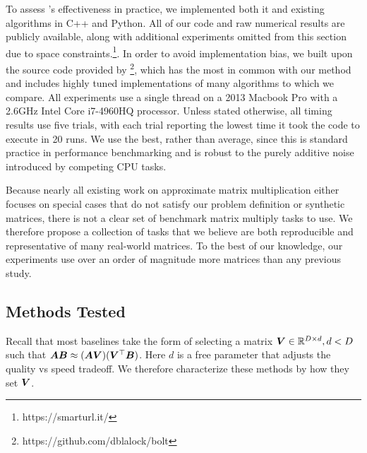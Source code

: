 
To assess \ours's effectiveness in practice, we implemented both it and existing algorithms in C++ and Python. All of our code and raw numerical results are publicly available, along with additional experiments omitted from this section due to space constraints.\footnote{https://smarturl.it/\ours}. In order to avoid implementation bias, we built upon the source code provided by \citep{bolt}\footnote{https://github.com/dblalock/bolt}, which has the most in common with our method and includes highly tuned implementations of many algorithms to which we compare. All experiments use a single thread on a 2013 Macbook Pro with a 2.6GHz Intel Core i7-4960HQ processor. Unless stated otherwise, all timing results use five trials, with each trial reporting the lowest time it took the code to execute in 20 runs. We use the best, rather than average, since this is standard practice in performance benchmarking and is robust to the purely additive noise introduced by competing CPU tasks.

Because nearly all existing work on approximate matrix multiplication either focuses on special cases that do not satisfy our problem definition \cite{quickerAdc, pq, opq} or synthetic matrices, there is not a clear set of benchmark matrix multiply tasks to use. We therefore propose a collection of tasks that we believe are both reproducible and representative of many real-world matrices. To the best of our knowledge, our experiments use over an order of magnitude more matrices than any previous study.%

\subsection{Methods Tested}
Recall that most baselines take the form of selecting a matrix $\bm{V} \in \mathbb{R}^{D \times d}, d < D$ such that $\bm{A} \bm{B} \approx (\bm{A} \bm{V}) (\bm{V}^\top \bm{B})$. Here $d$ is a free parameter that adjusts the quality vs speed tradeoff. We therefore characterize these methods by how they set $\bm{V}$.

